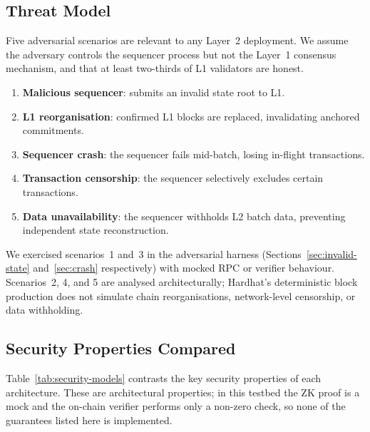 \subsection{Threat Model}

Five adversarial scenarios are relevant to any Layer~2 deployment. We assume the adversary controls the sequencer process but not the Layer~1 consensus mechanism, and that at least two-thirds of L1 validators are honest.

\begin{enumerate}
    \item \textbf{Malicious sequencer}: submits an invalid state root to L1.
    \item \textbf{L1 reorganisation}: confirmed L1 blocks are replaced, invalidating anchored commitments.
    \item \textbf{Sequencer crash}: the sequencer fails mid-batch, losing in-flight transactions.
    \item \textbf{Transaction censorship}: the sequencer selectively excludes certain transactions.
    \item \textbf{Data unavailability}: the sequencer withholds L2 batch data, preventing independent state reconstruction.
\end{enumerate}

We exercised scenarios~1 and~3 in the adversarial harness (Sections~\ref{sec:invalid-state} and~\ref{sec:crash} respectively) with mocked RPC or verifier behaviour. Scenarios~2, 4, and 5 are analysed architecturally; Hardhat's deterministic block production does not simulate chain reorganisations, network-level censorship, or data withholding.

\subsection{Security Properties Compared}

Table~\ref{tab:security-models} contrasts the key security properties of each architecture. These are architectural properties; in this testbed the ZK proof is a mock and the on-chain verifier performs only a non-zero check, so none of the guarantees listed here is implemented.

